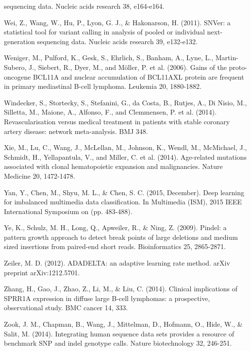 \documentclass{article}
\begin{document}
\begin{list}{}{%
\setlength{\topsep}{0pt}%
\setlength{\leftmargin}{0.5in}%
\setlength{\listparindent}{-0.5in}%
\setlength{\itemindent}{-0.5in}%
\setlength{\parsep}{\parskip}%
}
sequencing data. Nucleic acids research 38, e164-e164.\\\item[] Wei, Z., Wang, W., Hu, P., Lyon, G. J., \& Hakonarson, H. (2011). SNVer: a statistical tool for variant calling in analysis of pooled or individual next-generation sequencing data. Nucleic acids research 39, e132-e132.\\\item[] Weniger, M., Pulford, K., Gesk, S., Ehrlich, S., Banham, A., Lyne, L., Martin-Subero, J., Siebert, R., Dyer, M., and Möller, P. et al. (2006). Gains of the proto-oncogene BCL11A and nuclear accumulation of BCL11AXL protein are frequent in primary mediastinal B-cell lymphoma. Leukemia 20, 1880-1882.\\\item[] Windecker, S., Stortecky, S., Stefanini, G., da Costa, B., Rutjes, A., Di Nisio, M., Silletta, M., Maione, A., Alfonso, F., and Clemmensen, P. et al. (2014). Revascularisation versus medical treatment in patients with stable coronary artery disease: network meta-analysis. BMJ 348.\\\item[] Xie, M., Lu, C., Wang, J., McLellan, M., Johnson, K., Wendl, M., McMichael, J., Schmidt, H., Yellapantula, V., and Miller, C. et al. (2014). Age-related mutations associated with clonal hematopoietic expansion and malignancies. Nature Medicine 20, 1472-1478.\\\item[] Yan, Y., Chen, M., Shyu, M. L., \& Chen, S. C. (2015, December). Deep learning for imbalanced multimedia data classification. In Multimedia (ISM), 2015 IEEE International Symposium on (pp. 483-488).\\\item[] Ye, K., Schulz, M. H., Long, Q., Apweiler, R., \& Ning, Z. (2009). Pindel: a pattern growth approach to detect break points of large deletions and medium sized insertions from paired-end short reads. Bioinformatics 25, 2865-2871.\\\item[] Zeiler, M. D. (2012). ADADELTA: an adaptive learning rate method. arXiv preprint arXiv:1212.5701.\\\item[] Zhang, H., Gao, J., Zhao, Z., Li, M., \& Liu, C. (2014). Clinical implications of SPRR1A expression in diffuse large B-cell lymphomas: a prospective, observational study. BMC cancer 14, 333.\\\item[] Zook, J. M., Chapman, B., Wang, J., Mittelman, D., Hofmann, O., Hide, W., \& Salit, M. (2014). Integrating human sequence data sets provides a resource of benchmark SNP and indel genotype calls. Nature biotechnology 32, 246-251.\\


\end{list}
\end{document}
